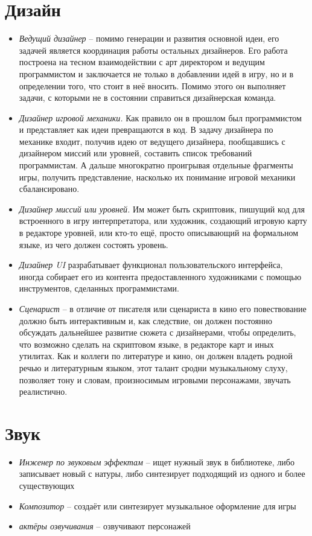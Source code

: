 \section{Дизайн}
\begin{itemize}
    \item \emph{Ведущий дизайнер} -- помимо генерации и развития основной идеи, его задачей является 
        координация работы остальных дизайнеров. Его работа построена на тесном взаимодействии с арт 
        директором и ведущим программистом и заключается не только в добавлении идей в игру, но и в 
        определении того, что стоит в неё вносить. Помимо этого он выполняет задачи, с которыми не в 
        состоянии справиться дизайнерская команда.
    \item \emph{Дизайнер игровой механики.} Как правило он в прошлом был программистом и представляет как 
        идеи превращаются в код. В задачу дизайнера по механике входит, получив идею от ведущего дизайнера, 
        пообщавшись с дизайнером миссий или уровней, составить список требований программистам. А дальше 
        многократно проигрывая отдельные фрагменты игры, получить представление, насколько их понимание 
        игровой механики сбалансировано.
    \item \emph{Дизайнер миссий или уровней.} Им может быть скриптовик, пишущий код для встроенного в игру 
        интерпретатора, или художник, создающий игровую карту в редакторе уровней, или кто-то ещё, просто 
        описывающий на формальном языке, из чего должен состоять уровень.
    \item \emph{Дизайнер UI} разрабатывает функционал пользовательского интерфейса, иногда собирает его из 
        контента предоставленного художниками с помощью инструментов, сделанных программистами.
    \item \emph{Сценарист} -- в отличие от писателя или сценариста в кино его повествование должно быть 
        интерактивным и, как следствие, он должен постоянно обсуждать дальнейшее развитие сюжета с 
        дизайнерами, чтобы определить, что возможно сделать на скриптовом языке, в редакторе карт и иных 
        утилитах. Как и коллеги по литературе и кино, он должен владеть родной речью и литературным языком, 
        этот талант сродни музыкальному слуху, позволяет тону и словам, произносимым игровыми персонажами, 
        звучать реалистично.
\end{itemize}

\section{Звук}
\begin{itemize}
    \item \emph{Инженер по звуковым эффектам} -- ищет нужный звук в библиотеке, либо записывает новый с 
        натуры, либо синтезирует подходящий из одного и более существующих
    \item \emph{Композитор} -- создаёт или синтезирует музыкальное оформление для игры
    \item \emph{актёры озвучивания} -- озвучивают персонажей
\end{itemize}

